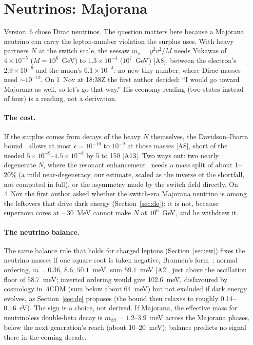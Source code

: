 \documentclass[11pt,a4paper]{article}
\newcommand{\chk}[1]{\textsf{[#1]}}
\begin{document}
\section{Neutrinos: Majorana}\label{sec:neutrinos}

Version~6 chose Dirac neutrinos. The question matters here because a Majorana neutrino can carry the lepton-number violation the surplus
uses. With heavy partners $N$ at the switch scale, the seesaw $m_\nu=y^2v^2/M$ needs Yukawas of $4\times10^{-5}$ ($M=10^6$~GeV) to
$1.3\times10^{-4}$ ($10^7$~GeV) \chk{A8}, between the electron's $2.9\times10^{-6}$ and the muon's $6.1\times10^{-4}$: no new tiny number,
where Dirac masses need $\sim10^{-12}$. On 1~Nov at 18:38Z the first author decided: ``I would go toward Majorana as well, so let's go that
way.'' His economy reading (two states instead of four) is a reading, not a derivation.

\paragraph{The cost.} If the surplus comes from decays of the heavy $N$ themselves, the Davidson--Ibarra bound~\cite{davidson} allows at most
$\epsilon=10^{-10}$ to $10^{-9}$ at those masses \chk{A8}, short of the needed $5\times10^{-9}$--$1.5\times10^{-8}$ by 5 to 150 \chk{A13}. Two ways out:
two nearly degenerate $N$, where the resonant enhancement~\cite{pilaftsis} needs a mass split of about 1--20\% (a mild near-degeneracy,
our estimate, scaled as the inverse of the shortfall, not computed in full), or the asymmetry made by the switch field directly. On 4~Nov the first author asked whether the
switch-era Majorana neutrino is among the leftovers that drive dark energy (Section~\ref{sec:de}); it is not, because supernova cores at
$\sim30$~MeV cannot make $N$ at $10^6$~GeV, and he withdrew it.

\paragraph{The neutrino balance.} The same balance rule that holds for charged leptons (Section~\ref{sec:ew}) fixes the neutrino masses if one
square root is taken negative, Brannen's form~\cite{brannen}: normal ordering, $m=0.36$, $8.6$, $50.1$~meV, sum $59.1$~meV \chk{A2}, just above the oscillation floor of
$58.7$~meV; inverted ordering would give 102.6~meV, disfavoured by cosmology in $\Lambda$CDM (sum below about 64~meV) but not excluded if dark energy
evolves, as Section~\ref{sec:de} proposes (the bound then relaxes to roughly 0.14--0.16~eV). The sign is a choice, not derived. If Majorana, the
effective mass for neutrinoless double-beta decay is $m_{\beta\beta}=1.2$--$3.9$~meV across the Majorana phases, below the next generation's reach (about
10--20~meV): balance predicts no signal there in the coming decade.
\end{document}
